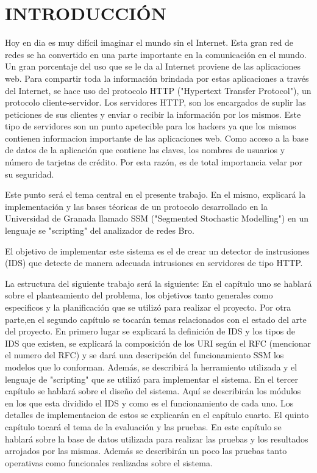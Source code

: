 \chapter*{INTRODUCCIÓN}
\label{intro}


Hoy en dia es muy difícil imaginar el mundo sin el Internet. Esta gran red de
redes se ha convertido en una parte importante en la comunicación en el mundo.
Un gran porcentaje del uso que se le da al Internet proviene de las aplicaciones
web. Para compartir toda la información brindada por estas aplicaciones a través del Internet, se hace uso del protocolo HTTP ("Hypertext Transfer Protocol"), un protocolo cliente-servidor. Los servidores HTTP, son los encargados de suplir las peticiones de sus clientes y enviar o recibir la información por los mismos.
Este tipo de servidores son un punto apetecible para los hackers ya que los
mismos contienen informacion importante de las aplicaciones web. Como acceso a
la base de datos de la aplicación que contiene las claves, los nombres de usuarios
y número de tarjetas de crédito. Por esta razón, es de total importancia velar por su seguridad.

Este punto será el tema central en el presente trabajo. En el
mismo, explicará la implementación y las bases téoricas de un protocolo desarrollado en
la Universidad de Granada llamado SSM ("Segmented Stochastic Modelling") en un
lenguaje se "scripting" del analizador de redes Bro.

El objetivo de implementar este sistema es el de crear un detector de instrusiones
(IDS) que detecte de manera adecuada intrusiones en servidores de tipo
HTTP.

La estructura del siguiente trabajo será la siguiente:
En el capítulo uno se hablará sobre el planteamiento del problema,
los objetivos tanto generales como especificos y la planificación que se utilizó para
realizar el proyecto.
Por otra parte,en el segundo capítulo se tocarán temas relacionados con el
estado del arte del proyecto. En primero lugar se explicará la definición de IDS y
los tipos de IDS que existen, se explicará la composición de los URI según el RFC
(mencionar el numero del RFC) y se dará una descripción del funcionamiento SSM
los modelos que lo conforman. Además, se describirá la herramiento utilizada
y el lenguaje de "scripting" que se utilizó para implementar el sistema.
En el tercer capítulo se hablará sobre el diseño del sistema. Aquí se describirán
los módulos en los que esta dividido el IDS y como es el funcionamiento de cada
uno. Los detalles de implementacion de estos se explicarán en el capítulo cuarto.
El quinto capítulo tocará el tema de la evaluación y las pruebas. En este capítulo
se hablará sobre la base de datos utilizada para realizar las pruebas y los
resultados arrojados por las mismas. Además se describirán un poco las pruebas
tanto operativas como funcionales realizadas sobre el sistema.







